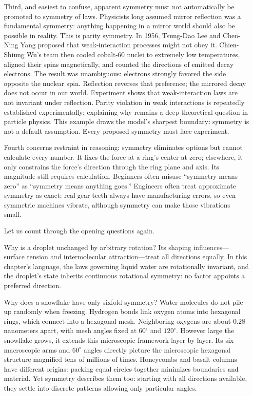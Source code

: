 Third, and easiest to confuse, apparent symmetry must not automatically be promoted to symmetry of laws. Physicists long assumed mirror reflection was a fundamental symmetry: anything happening in a mirror world should also be possible in reality. This is parity symmetry. In 1956, Tsung-Dao Lee and Chen-Ning Yang proposed that weak-interaction processes might not obey it. Chien-Shiung Wu's team then cooled cobalt-60 nuclei to extremely low temperatures, aligned their spins magnetically, and counted the directions of emitted decay electrons. The result was unambiguous: electrons strongly favored the side opposite the nuclear spin. Reflection reverses that preference; the mirrored decay does not occur in our world. Experiment shows that weak-interaction laws are not invariant under reflection. Parity violation in weak interactions is repeatedly established experimentally; explaining why remains a deep theoretical question in particle physics. This example draws the model's sharpest boundary: symmetry is not a default assumption. Every proposed symmetry must face experiment.

Fourth concerns restraint in reasoning: symmetry eliminates options but cannot calculate every number. It fixes the force at a ring's center at zero; elsewhere, it only constrains the force's direction through the ring plane and axis. Its magnitude still requires calculation. Beginners often misuse ``symmetry means zero'' as ``symmetry means anything goes.'' Engineers often treat approximate symmetry as exact: real gear teeth always have manufacturing errors, so even symmetric machines vibrate, although symmetry can make those vibrations small.


Let us count through the opening questions again.

Why is a droplet unchanged by arbitrary rotation? Its shaping influences---surface tension and intermolecular attraction---treat all directions equally. In this chapter's language, the laws governing liquid water are rotationally invariant, and the droplet's state inherits continuous rotational symmetry: no factor appoints a preferred direction.

Why does a snowflake have only sixfold symmetry? Water molecules do not pile up randomly when freezing. Hydrogen bonds link oxygen atoms into hexagonal rings, which connect into a hexagonal mesh. Neighboring oxygens are about \(0.28\) nanometers apart, with mesh angles fixed at \(60^\circ\) and \(120^\circ\). However large the snowflake grows, it extends this microscopic framework layer by layer. Its six macroscopic arms and \(60^\circ\) angles directly picture the microscopic hexagonal structure magnified tens of millions of times. Honeycombs and basalt columns have different origins: packing equal circles together minimizes boundaries and material. Yet symmetry describes them too: starting with all directions available, they settle into discrete patterns allowing only particular angles.

